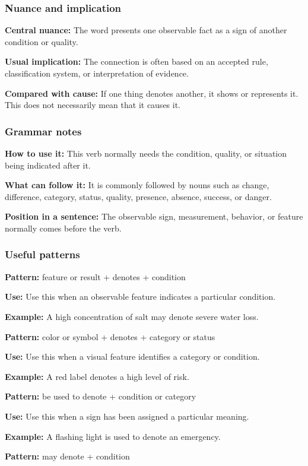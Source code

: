 \documentclass[11pt]{article}
\begin{document}
\subsubsection{Nuance and implication}
\textbf{Central nuance:} The word presents one observable fact as a sign of another condition or quality.

\textbf{Usual implication:} The connection is often based on an accepted rule, classification system, or interpretation of evidence.

\textbf{Compared with cause:} If one thing denotes another, it shows or represents it. This does not necessarily mean that it causes it.

\subsubsection{Grammar notes}
\textbf{How to use it:} This verb normally needs the condition, quality, or situation being indicated after it.

\textbf{What can follow it:} It is commonly followed by nouns such as change, difference, category, status, quality, presence, absence, success, or danger.

\textbf{Position in a sentence:} The observable sign, measurement, behavior, or feature normally comes before the verb.

\subsubsection{Useful patterns}
\textbf{Pattern:} feature or result + denotes + condition

\textbf{Use:} Use this when an observable feature indicates a particular condition.

\textbf{Example:} A high concentration of salt may denote severe water loss.

\textbf{Pattern:} color or symbol + denotes + category or status

\textbf{Use:} Use this when a visual feature identifies a category or condition.

\textbf{Example:} A red label denotes a high level of risk.

\textbf{Pattern:} be used to denote + condition or category

\textbf{Use:} Use this when a sign has been assigned a particular meaning.

\textbf{Example:} A flashing light is used to denote an emergency.

\textbf{Pattern:} may denote + condition
\end{document}
